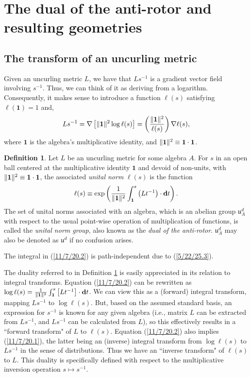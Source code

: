 \documentclass{amsart}
\theoremstyle{definition}
\newtheorem{definition}[theorem]{Definition}
\numberwithin{theorem}{section}
\numberwithin{equation}{section}
\begin{document}
  \section{The dual of the anti-rotor and resulting geometries} 
  \subsection{The transform of an uncurling metric}
  
  \enlargethispage{.5cm}
 Given an uncurling metric $L$, we have that $Ls^{-1}$ is a gradient vector field involving $s^{-1}$.  Thus, we can think of it as deriving from a logarithm.  Consequently, it makes sense to introduce a function $\ell(s)$ satisfying $\ell(\mathbf{1})=1$ and,
  \begin{equation}\label{11/7/20.1} Ls^{-1}  = \nabla\left[\|{\bf 1}\|^2\log  \ell(s)\right] =   \left(\frac{\|{\bf 1}\|^2}{ \ell(s)}\right)\nabla \ell(s),\end{equation} where $\mathbf{1}$ is the algebra's multiplicative identity, and $\|{\bf 1}\|^2 \equiv {\bf 1}\cdot {\bf 1}$. 

   \begin{definition}\label{9/21/23.2} Let $L$ be an uncurling metric for some algebra $A$.  For $s$ in an open ball centered at the multiplicative identity $\mathbf{1}$ and devoid of non-units, with $\|{\bf 1}\|^2 \equiv \mathbf{1}\cdot\mathbf{1}$, the associated {\it unital norm} $ \ell(s)$ is the function 
  \begin{equation}\label{11/7/20.2} \ell(s) \equiv \exp\left(\frac{1}{\|{\bf 1}\|^2}\int_{\bf 1}^s \left(Lt^{-1}\right)\cdot \mathbf{d}t\right).\end{equation} 
   The set of unital norms associated with an algebra, which is an abelian group $\mathfrak{u}^d_A$ with respect to the usual point-wise operation of multiplication of functions, is called the {\it unital norm group}, also known as the {\it dual of the anti-rotor}. $\mathfrak{u}^d_A$ may also be denoted as $\mathfrak{u}^d$ if no confusion arises.  
   \end{definition} 
   
The integral in (\ref{11/7/20.2}) is path-independent due to (\ref{5/22/25.3}).  

The duality referred to in Definition \ref{9/21/23.2} is easily appreciated in its relation to integral transforms.  Equation (\ref{11/7/20.2}) can be rewritten as  \mbox{$\log\ell(s) = \frac{1}{\|\mathbf{1}\|^2}\int_{{\bf 1}}^{s} \left[L t^{-1}\right]\cdot \mathbf{d}t$.}   We can view this as a (forward) integral transform, mapping $Ls^{-1}$ to $\log \ell(s)$.  But, based on the assumed standard basis, an expression for $s^{-1}$ is known for any given algebra (i.e., matrix $L$ can be extracted from $Ls^{-1}$, and $Ls^{-1}$ can be calculated from $L$), so this effectively results in a ``forward transform" of $L$ to $\ell(s)$.    Equation (\ref{11/7/20.2}) also implies (\ref{11/7/20.1}), the latter being an (inverse) integral transform from $\log \ell(s)$ to $Ls^{-1}$ in the sense of distributions.  Thus we have an ``inverse transform" of $\ell(s)$ to $L$.
This duality is specifically defined with respect to the multiplicative inversion operation $s\mapsto s^{-1}$.
   
\end{document}
